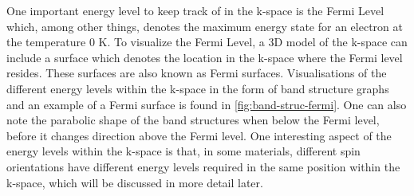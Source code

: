     \noindent One important energy level to keep track of in the k-space is the Fermi Level which, among other things, denotes the maximum energy state for an 
    electron at the temperature 0 K. To visualize the Fermi Level, a 3D model of the k-space can include a surface which denotes 
    the location in the k-space where the Fermi level resides. \cite{kahn2016fermi} These surfaces are also known as Fermi surfaces. Visualisations of the different energy 
    levels within the k-space in the form of band structure graphs and an example of a Fermi surface is found in \autoref{fig:band-struc-fermi}. One can 
    also note the parabolic shape of the band structures when below the Fermi level, before it changes direction above the Fermi level. One interesting 
    aspect of the energy levels within the k-space is that, in some materials, different spin orientations have different energy levels required in the 
    same position within the k-space, which will be discussed in more detail later.
    
